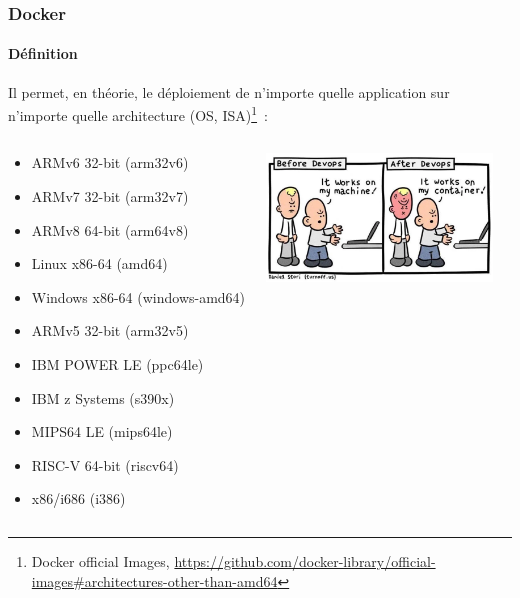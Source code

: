 \documentclass{beamer}
\begin{document}
    \begin{frame}
        \transdissolve
        \frametitle{Docker}
        \framesubtitle{Définition}
        Il permet, en théorie, le déploiement de n'importe quelle application sur n'importe quelle architecture (OS, ISA)\footnote{Docker official Images, \url{https://github.com/docker-library/official-images\#architectures-other-than-amd64}}~:
        \bigbreak
        \begin{columns}
            \begin{scriptsize}
                \begin{itemize}
                    \item ARMv6 32-bit (arm32v6)
                    \item ARMv7 32-bit (arm32v7)
                    \item ARMv8 64-bit (arm64v8)
                    \item Linux x86-64 (amd64)
                    \item Windows x86-64 (windows-amd64)
                    \item ARMv5 32-bit (arm32v5)
                    \item IBM POWER LE (ppc64le)
                    \item IBM z Systems (s390x)
                    \item MIPS64 LE (mips64le)
                    \item RISC-V 64-bit (riscv64)
                    \item x86/i686 (i386)
                \end{itemize}
            \end{scriptsize}
            \centering
            \includegraphics[width=6cm]{image/it-works.png}
        \end{columns}
    \end{frame}
\end{document}
